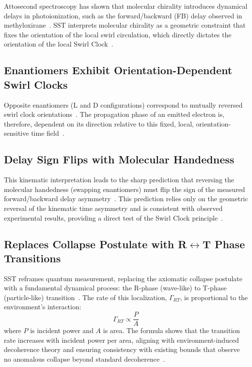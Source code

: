 \documentclass[10pt,reprint,aps,onecolumn,nofootinbib]{revtex4-2}
\begin{document}
Attosecond spectroscopy has shown that molecular chirality introduces dynamical delays in photoionization, such as the forward/backward (FB) delay observed in methyloxirane~\cite{6}. SST interprets molecular chirality as a geometric constraint that fixes the orientation of the local swirl circulation, which directly dictates the orientation of the local Swirl Clock~\cite{6}.

\subsection*{Enantiomers Exhibit Orientation-Dependent Swirl Clocks}

Opposite enantiomers (L and D configurations) correspond to mutually reversed swirl clock orientations~\cite{6}. The propagation phase of an emitted electron is, therefore, dependent on its direction relative to this fixed, local, orientation-sensitive time field~\cite{6}.

\subsection*{Delay Sign Flips with Molecular Handedness}

This kinematic interpretation leads to the sharp prediction that reversing the molecular handedness (swapping enantiomers) must flip the sign of the measured forward/backward delay asymmetry~\cite{6}. This prediction relies only on the geometric reversal of the kinematic time asymmetry and is consistent with observed experimental results, providing a direct test of the Swirl Clock principle~\cite{6}.

\subsection*{Replaces Collapse Postulate with R$\leftrightarrow$T Phase Transitions}

SST reframes quantum measurement, replacing the axiomatic collapse postulate with a fundamental dynamical process: the R-phase (wave-like) to T-phase (particle-like) transition~\cite{1}. The rate of this localization, $\Gamma_{RT}$, is proportional to the environment's interaction:
\[
\Gamma_{RT} \propto \frac{P}{A}
\]
where $P$ is incident power and $A$ is area. The formula shows that the transition rate increases with incident power per area, aligning with environment-induced decoherence theory and ensuring consistency with existing bounds that observe no anomalous collapse beyond standard decoherence~\cite{1}.
\end{document}
